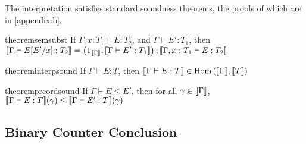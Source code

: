 The interpretation satisfies standard soundness theorems, the 
proofs of which 
are in \autoref{appendix:b}.%


\begin{restatable}[Compositionality]{theorem}{semsubst}
\label{thm:sem-subst}
If $\Gamma, x : T_1 \vdash E : T_2$, and $\Gamma \vdash E' : T_1$, then $\llbracket \Gamma \vdash E[E'/x] : T_2 \rrbracket =  \left(1_{\llbracket \Gamma \rrbracket},\llbracket \Gamma \vdash E' : T_1 \rrbracket\right) ; \llbracket \Gamma, x:T_1 \vdash E : T_2 \rrbracket$
\end{restatable}


\begin{restatable}{theorem}{interpsound}
\label{thm:term-soundness}
If $\Gamma \vdash E : T$, then $\llbracket \Gamma \vdash E : T \rrbracket \in \operatorname{Hom}\left(\llbracket \Gamma \rrbracket,\llbracket T \rrbracket\right)$
\end{restatable}


\begin{restatable}{theorem}{preordsound}
\label{thm:soundness-inequality}
If $\Gamma \vdash E \leq E'$, then for all $\gamma \in \llbracket \Gamma \rrbracket$, $\llbracket \Gamma \vdash E : T \rrbracket(\gamma) \leq \llbracket \Gamma \vdash E' : T \rrbracket(\gamma)$
\end{restatable}

\subsection{Binary Counter Conclusion}

